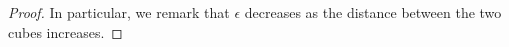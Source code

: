 \documentclass[12 pt]{article}
\theoremstyle{definition} \newtheorem{definition}{Definition}[section]
\theoremstyle{definition} \newtheorem{remark}[definition]{Remark}
\theoremstyle{plain} \newtheorem{lemma}[definition]{Lemma}
\theoremstyle{plain} \newtheorem{proposition}[definition]{Proposition}
\theoremstyle{plain} \newtheorem{theorem}[definition]{Theorem}
\theoremstyle{plain} \newtheorem{corollary}[definition]{Corollary}
\theoremstyle{definition} \newtheorem{example}[definition]{Example}
\theoremstyle{definition} \newtheorem{assumption}[definition]{Assumption}
\theoremstyle{definition} \newtheorem{conjecture}[definition]{Conjecture}
\newcommand{\1}{\mathbbm 1}
\numberwithin{equation}{section}
\begin{document}
\begin{appendix}
\begin{proof}
   In particular, we remark that $\epsilon$ decreases as the distance between the two cubes increases. 


\end{proof}
\end{appendix}
\end{document}
